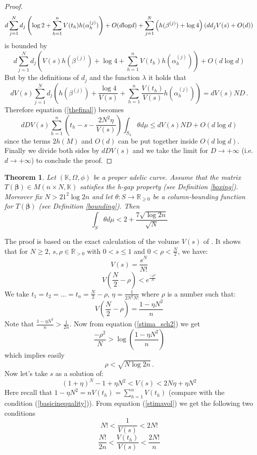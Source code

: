 \documentclass[10 pt,a4paper]{article}
\theoremstyle{plain}
\newtheorem{thm}{Theorem}[section]
\theoremstyle{definition}
\theoremstyle{named}
\begin{document}
\begin{proof}
$$
d\sum_{j=1}^{N}d_j\left(\log 2+ \sum_{h=1}^{n}V(t_h)h(\alpha^{(j)}_{h})\right)+O(d{\rm{log}}d)+\sum_{j=1}^{N}\left( h(\beta^{(j)})+\log 4\right)(dd_jV(s)+O(d))
$$
is bounded by 
$$
d\sum_{j=1}^{N}d_j\left(V(s) h(\beta^{(j)})+\log 4+   \sum_{h=1}^{n}V(t_h)h(\alpha^{(j)}_{h})\right)+O(d\log d)
$$
But by the definitions of $d_j$ and the function $\lambda$ it holds that
\begin{equation}
dV(s)\sum_{j=1}^{N}d_j\left(h(\beta^{(j)})+\frac{\log 4}{V(s)}+   \sum_{h=1}^{n}\frac{V(t_h)}{V(s)}h(\alpha^{(j)}_{h})\right)=dV(s)ND\,.
\end{equation}
Therefore equation (\ref{thefinal}) becomes
$$
 dDV(s)\sum_{h=1}^{n}\left(t_h-s-\frac{2N^2\eta}{V(s)} \right)\int_{ S_h}\theta d\mu\leq dV(s)ND+O(d\log d)
$$
since the terms $2h(M)$ and $O(d)$ can be put together inside $O(d\log d)$. Finally we divide both sides by $dDV(s)$ and we take the limit for $D\to+\infty$ (i.e. $d\to+\infty$) to conclude the proof.
\end{proof}


\begin{thm}\label{teoremadue}  Let $(\mathbb K,\Omega, \phi)$ be a proper adelic curve. Assume that the matrix $T(\bm{\beta})\in M(n\times N,\mathbb K)$ satisfies the h-gap property (see Definition \ref{boxing}). Moreover fix $N>21^2\log 2n$ and let $\theta\colon S\to\mathbb R_{\ge 0}$ be a column-bounding function for $T(\bm{\beta})$ (see Definition \ref{bounding}). Then
$$
\int_{ S}\theta d \mu<2+\frac{7\sqrt{\log 2n}}{\sqrt{N}}
$$
\end{thm}

\proof The proof is based on the exact calculation of the volume $V(s)$ of \cite[Chap. 2, Lemma 5A, 5B]{schm}. It shows that for  $N\geq 2$, $s,\rho\in\mathbb R_{>0}$ with $0<s\leq 1$ and $0<\rho <\frac{N}{2}$, we have:
\begin{equation}\label{stima_sch}
V(s)= \frac{s^N}{N!}
\end{equation}
\begin{equation}\label{stima_sch2}
V\left(\frac{N}{2}-\rho\right)<e^{\frac{-\rho^2}{N} }
\end{equation}
We take $t_1=t_2=\ldots= t_n=\frac{N}{2}-\rho$, $\eta=\frac{1}{2N^2 N!}$ where $\rho$ is a number such that:
$$
V\left(\frac{N}{2}-\rho\right)=\frac{1-\eta N^2}{n}
$$
Note that $\frac{1-\eta N^2}{n}>\frac{1}{2n}$. Now from equation (\ref{stima_sch2}) we get
$$
\frac{-\rho^2}{N}>\log\left(\frac{1-\eta N^2}{n}\right)
$$
which implies easily
$$
\rho< \sqrt {N\log2n}\,.
$$
Now let's take $s$ as a solution of:
\begin{equation}\label{stimavol}
(1+\eta)^{N}-1+\eta N^2<V(s)< 2N\eta +\eta N^2
\end{equation}
Here recall that $1-\eta N^2=nV(t_h)=\sum^n_{h=1} V(t_h)$ (compare with the condition (\ref{basicinequality})).
From equation (\ref{stimavol}) we get the following two conditions
\[
N!<\frac{1}{V(s)}<2N!
\]
\[
\frac{N!}{2n}<\frac{V(t_h)}{V(s)}<\frac{2N!}{n}
\]
\end{document}
